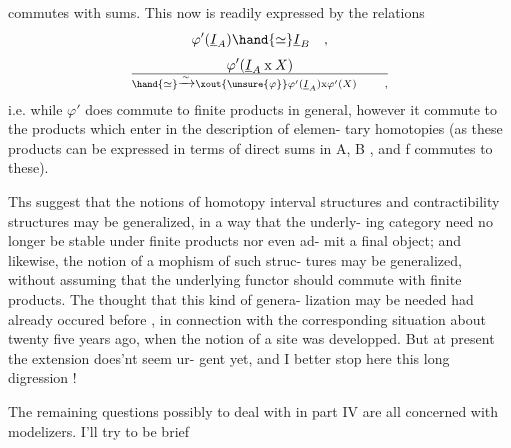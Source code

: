 commutes with sums.  This now is readily expressed by the relations
\[ \varphi'(\underline{I}_A) \hand{\simeq} \underline{I}_B \quad , \]
\[ \varphi'(\underline{I}_A \mathbin{\mathrm{x}} X) \over{\hand{\simeq}}{\xrightarrow{\sim}} \xout{\unsure{\varphi}} \varphi'(\underline{I}_A)\mathbin{\mathrm{x}}\varphi'(X) \qquad , \]
i.e.  while $\varphi'$  does \hand{\uline{\textcolor{black}{not}}} commute to finite products in general,  however
it \hand{\uline{\textcolor{black}{does}}} commute to the products which enter in the description of elemen-%
tary homotopies (as these products can be expressed in terms of direct
sums in  A, B ,  and f commutes to these).

Ths  suggest that the notions of homotopy interval structures and
contractibility structures may be generalized,  in a way that the underly-%
ing category need no longer  be stable under finite products nor even ad-%
mit a final object;  and likewise,  the notion of a mophism of such struc-%
tures may be generalized,  without assuming that the underlying functor
should commute with finite products. The thought that this kind of genera-%
lization may be needed had already occured before , in connection with
the corresponding situation about twenty five years ago,  when the notion
of a site was developped.  But at present the extension does'nt seem ur-%
gent yet,  and I better stop  here this long digression !

The remaining questions  possibly to deal with in part IV  are all
concerned with modelizers.   I'll try to be brief\hand{!}

